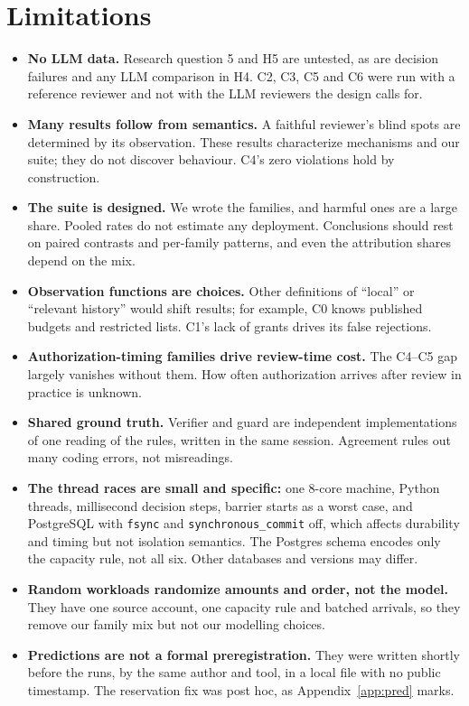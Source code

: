 \documentclass[10pt]{article}
\begin{document}
\section{Limitations}\label{app:lim}
\begin{itemize}
\item \textbf{No LLM data.} Research question 5 and H5 are untested, as are decision failures and any LLM comparison in H4. C2, C3, C5 and C6 were run with a reference reviewer and not with the LLM reviewers the design calls for.
\item \textbf{Many results follow from semantics.} A faithful reviewer's blind spots are determined by its observation. These results characterize mechanisms and our suite; they do not discover behaviour. C4's zero violations hold by construction.
\item \textbf{The suite is designed.} We wrote the families, and harmful ones are a large share. Pooled rates do not estimate any deployment. Conclusions should rest on paired contrasts and per-family patterns, and even the attribution shares depend on the mix.
\item \textbf{Observation functions are choices.} Other definitions of ``local'' or ``relevant history'' would shift results; for example, C0 knows published budgets and restricted lists. C1's lack of grants drives its false rejections.
\item \textbf{Authorization-timing families drive review-time cost.} The C4--C5 gap largely vanishes without them. How often authorization arrives after review in practice is unknown.
\item \textbf{Shared ground truth.} Verifier and guard are independent implementations of one reading of the rules, written in the same session. Agreement rules out many coding errors, not misreadings.
\item \textbf{The thread races are small and specific:} one 8-core machine, Python threads, millisecond decision steps, barrier starts as a worst case, and PostgreSQL \pgVersion{} with \texttt{fsync} and \texttt{synchronous\_commit} off, which affects durability and timing but not isolation semantics. The Postgres schema encodes only the capacity rule, not all six. Other databases and versions may differ.
\item \textbf{Random workloads randomize amounts and order, not the model.} They have one source account, one capacity rule and batched arrivals, so they remove our family mix but not our modelling choices.
\item \textbf{Predictions are not a formal preregistration.} They were written shortly before the runs, by the same author and tool, in a local file with no public timestamp. The reservation fix was post hoc, as Appendix~\ref{app:pred} marks.

\end{itemize}
\end{document}
